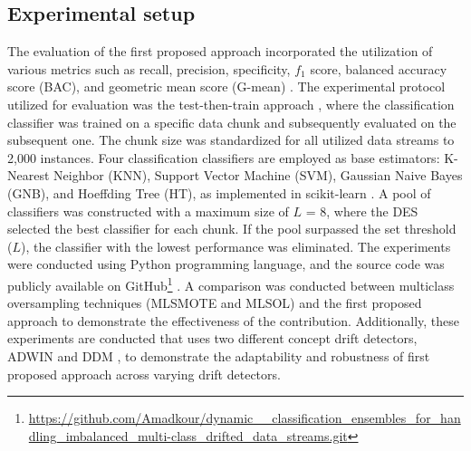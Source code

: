 \subsection{Experimental setup}
The evaluation of the first proposed approach incorporated the utilization of various metrics such as recall, precision, specificity, $f_1$ score, balanced accuracy score (BAC), and geometric mean score (G-mean) \cite{bu2016pdf}. The experimental protocol utilized for evaluation was the test-then-train approach \cite{venkatasubramanianinformation}, where the classification classifier was trained on a specific data chunk and subsequently evaluated on the subsequent one. The chunk size was standardized for all utilized data streams to 2,000 instances. Four classification classifiers are employed as base estimators: K-Nearest Neighbor (KNN), Support Vector Machine (SVM), Gaussian Naive Bayes (GNB), and Hoeffding Tree (HT), as implemented in scikit-learn \cite{frias2014online}. A pool of classifiers was constructed with a maximum size of $L$ = 8, where the DES selected the best classifier for each chunk. If the pool surpassed the set threshold ($L$), the classifier with the lowest performance was eliminated. The experiments were conducted using Python programming language, and the source code was publicly available on GitHub\footnote{\url{https://github.com/Amadkour/dynamic__classification_ensembles_for_handling_imbalanced_multi-class_drifted_data_streams.git}} . A comparison was conducted between multiclass oversampling techniques (MLSMOTE and MLSOL) and the first proposed approach to demonstrate the effectiveness of the contribution. Additionally, these experiments are conducted that uses two different concept drift detectors, ADWIN \cite{storkey2008training} and DDM \cite{losing2016knn}, to demonstrate the adaptability and robustness of first proposed approach across varying drift detectors.

